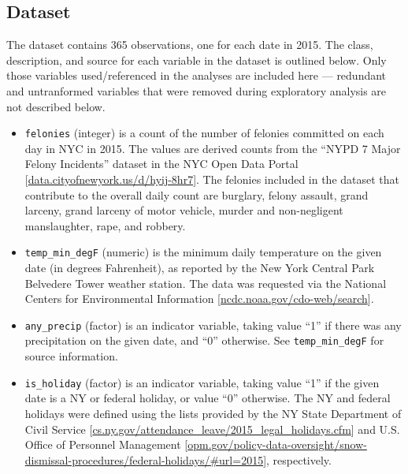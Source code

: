 \documentclass[11pt,notitlepage]{article}
\begin{document}
\subsection{Dataset}
\label{sec:dataset}

The dataset contains 365 observations, one for each date in 2015. The class, description, and source for each variable in the dataset is outlined below. Only those variables used/referenced in the analyses are included here --- redundant and untranformed variables that were removed during exploratory analysis are not described below.

\begin{itemize}
\setlength\itemsep{-3pt}
\vspace*{-3mm}
	
\item \texttt{felonies} (integer) is a count of the number of felonies committed on each day in NYC in 2015. The values are derived counts from the ``NYPD 7 Major Felony Incidents'' dataset in the NYC Open Data Portal [\href{https://data.cityofnewyork.us/Public-Safety/NYPD-7-Major-Felony-Incidents/hyij-8hr7}{data.cityofnewyork.us/d/hyij-8hr7}]. The felonies included in the dataset that contribute to the overall daily count are burglary, felony assault, grand larceny, grand larceny of motor vehicle, murder and non-negligent manslaughter, rape, and robbery.

\item \texttt{temp_min_degF} (numeric) is the minimum daily temperature on the given date (in degrees Fahrenheit), as reported by the New York Central Park Belvedere Tower weather station. The data was requested via the National Centers for Environmental Information [\href{http://www.ncdc.noaa.gov/cdo-web/search}{ncdc.noaa.gov/cdo-web/search}].


\item \texttt{any_precip} (factor) is an indicator variable, taking value ``1'' if there was any precipitation on the given date, and ``0'' otherwise. See \texttt{temp_min_degF} for source information.


\item \texttt{is_holiday} (factor) is an indicator variable, taking value ``1'' if the given date is a NY or federal holiday, or value ``0'' otherwise. The NY and federal holidays were defined using the lists provided by the NY State Department of Civil Service [\href{https://www.cs.ny.gov/attendance_leave/2015_legal_holidays.cfm}{cs.ny.gov/attendance_leave/2015_legal_holidays.cfm}] and U.S. Office of Personnel Management [\href{https://www.opm.gov/policy-data-oversight/snow-dismissal-procedures/federal-holidays/\#url=2015}{opm.gov/policy-data-oversight/snow-dismissal-procedures/federal-holidays/\#url=2015}], respectively.



\end{itemize}
\end{document}
